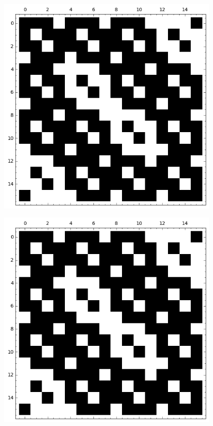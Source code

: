 \documentclass[12pt,a4paper]{article}
\begin{document}
\begin{figure}[!hb]
\centering
\begin{minipage}{.48\textwidth}
  \centering
  \includegraphics[width=.9\linewidth]{../matrix_plot/re4_1_weight_class_matrix.png}
  \label{fig:c4_1_weight_class_matrix}
\end{minipage}%
\begin{minipage}{.48\textwidth}
  \centering
  \includegraphics[width=.9\linewidth]{../matrix_plot/re4_1_bent_cayley_graph_index_matrix.png}
  \label{fig:c4_1_bent_cayley_graph_index_matrix}
\end{minipage}
\end{figure}
\end{document}
